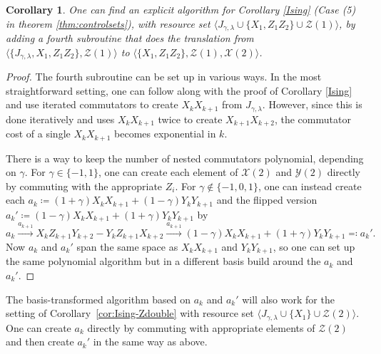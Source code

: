 \documentclass[12pt, a4-paper]{amsart}
\newcommand{\cX}{\mathcal{X}}
\newcommand{\cY}{\mathcal{Y}}
\newcommand{\cZ}{\mathcal{Z}}
\numberwithin{equation}{section}
\newtheorem{corollary}[lemma]{Corollary}
\begin{document}
\begin{corollary}
    One can find an explicit algorithm for Corollary \ref{Ising} (Case (5) in theorem \ref{thm:controlsets}), with resource set $\langle J_{\gamma, \lambda} \cup \{X_1, Z_1 Z_2\} \cup \cZ(1)\rangle$, by adding a fourth subroutine that does the translation from $\langle \{J_{\gamma, \lambda}, X_1, Z_1 Z_2 \}, \cZ(1) \rangle$ to $\langle \{X_1, Z_1 Z_2 \}, \cZ(1), \cX(2) \rangle$.
\end{corollary}
\begin{proof}
    The fourth subroutine can be set up in various ways. In the most straightforward setting, one can follow along with the proof of Corollary \ref{Ising} and use iterated commutators to create $X_k X_{k+1}$ from $J_{\gamma, \lambda}$. However, since this is done iteratively and uses $X_k X_{k+1}$ twice to create $X_{k+1} X_{k+2}$, the commutator cost of a single $X_k X_{k+1}$ becomes exponential in $k$. 
    
    There is a way to keep the number of nested commutators polynomial, depending on $\gamma$. For $\gamma \in \{-1,1\}$, one can create each element of $\cX(2)$ and $\cY(2)$ directly by commuting with the appropriate $Z_i$. For $\gamma \notin \{-1,0,1\}$, one can instead create each $a_k \coloneqq (1+\gamma) X_k X_{k+1} + (1-\gamma) Y_k Y_{k+1}$ and the flipped version $a_k' \coloneqq (1-\gamma) X_k X_{k+1} + (1+\gamma) Y_k Y_{k+1}$ by 
    \begin{equation}
        a_k \stackrel{a_{k+1}}{\longrightarrow} X_k Z_{k+1} Y_{k+2} - Y_k Z_{k+1} X_{k+2} \stackrel{a_{k+1}}{\longrightarrow} (1-\gamma) X_k X_{k+1} + (1+\gamma) Y_k Y_{k+1} \eqqcolon a_k'.
    \end{equation}
    Now $a_k$ and $a_k'$ span the same space as $X_k X_{k+1}$ and $Y_k Y_{k+1}$, so one can set up the same polynomial algorithm but in a different basis build around the $a_k$ and $a_k'$.
\end{proof}

The basis-transformed algorithm based on $a_k$ and $a_k'$ will also work for the setting of Corollary~\ref{cor:Ising-Zdouble} with resource set $\langle J_{\gamma, \lambda} \cup \{X_1\} \cup \cZ(2)\rangle$. One can create $a_k$ directly by commuting with appropriate elements of $\cZ(2)$ and then create $a_k'$ in the same way as above.
\end{document}
